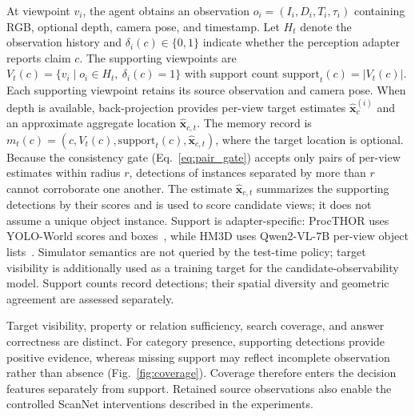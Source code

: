 \documentclass[letterpaper, 10 pt, conference]{ieeeconf}
\newcommand{\support}{\mathrm{support}}
\begin{document}
At viewpoint $v_i$, the agent obtains an observation $o_i=(I_i,D_i,T_i,\tau_i)$ containing RGB, optional depth, camera pose, and timestamp. Let $H_t$ denote the observation history and $\delta_i(c)\in\{0,1\}$ indicate whether the perception adapter reports claim $c$. The supporting viewpoints are $V_t(c)=\{v_i \mid o_i\in H_t,\ \delta_i(c)=1\}$ with support count $\support_t(c)=|V_t(c)|$. Each supporting viewpoint retains its source observation and camera pose. When depth is available, back-projection provides per-view target estimates $\hat{\mathbf{x}}_c^{(i)}$ and an approximate aggregate location $\hat{\mathbf{x}}_{c,t}$. The memory record is $m_t(c)=(c,V_t(c),\support_t(c),\hat{\mathbf{x}}_{c,t})$, where the target location is optional. Because the consistency gate (Eq.~\ref{eq:pair_gate}) accepts only pairs of per-view estimates within radius $r$, detections of instances separated by more than $r$ cannot corroborate one another. The estimate $\hat{\mathbf{x}}_{c,t}$ summarizes the supporting detections by their scores and is used to score candidate views; it does not assume a unique object instance. Support is adapter-specific: ProcTHOR uses YOLO-World scores and boxes~\citep{cheng2024yoloworld}, while HM3D uses Qwen2-VL-7B per-view object lists~\citep{wang2024qwen2vl}. Simulator semantics are not queried by the test-time policy; target visibility is additionally used as a training target for the candidate-observability model. Support counts record detections; their spatial diversity and geometric agreement are assessed separately.

Target visibility, property or relation sufficiency, search coverage, and answer correctness are distinct. For category presence, supporting detections provide positive evidence, whereas missing support may reflect incomplete observation rather than absence (Fig.~\ref{fig:coverage}). Coverage therefore enters the decision features separately from support. Retained source observations also enable the controlled ScanNet interventions described in the experiments.




\end{document}
